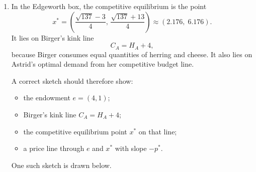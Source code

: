 \documentclass[12pt]{article}
\begin{document}
\begin{enumerate}[label=(\alph*)]
    \paragraph{Equilibrium allocations.}
    Substitute \(p^{*}\) into Astrid's demand:
    \[
    H_A^{*}=\frac{4p^{*}+1}{2p^{*}}
    =\frac{\sqrt{137}-3}{4},
    \]
    and
    \[
    C_A^{*}=\frac{4p^{*}+1}{2}
    =\frac{\sqrt{137}+13}{4}.
    \]
    Birger then consumes
    \[
    H_B^{*}=4-H_A^{*}=\frac{19-\sqrt{137}}{4},
    \]
    and
    \[
    C_B^{*}=8-C_A^{*}=\frac{19-\sqrt{137}}{4}.
    \]

    Hence the competitive equilibrium is

    \begin{equation*}
    \boxed{
    \begin{aligned}
        p^{*} &= \frac{11+\sqrt{137}}{8}, \\
        (H_A^{*},C_A^{*}) &= \left(\frac{\sqrt{137}-3}{4},\,\frac{\sqrt{137}+13}{4}\right), \\
        (H_B^{*},C_B^{*}) &= \left(\frac{19-\sqrt{137}}{4},\,\frac{19-\sqrt{137}}{4}\right).
    \end{aligned}
    }
\end{equation*}

    \item
    In the Edgeworth box, the competitive equilibrium is the point
    \[
    x^{*}=\left(\frac{\sqrt{137}-3}{4},\,\frac{\sqrt{137}+13}{4}\right)
    \approx (2.176,\;6.176).
    \]
    It lies on Birger's kink line
    \[
    C_A=H_A+4,
    \]
    because Birger consumes equal quantities of herring and cheese. It also lies on Astrid's optimal demand from her competitive budget line.

    A correct sketch should therefore show:
    \begin{itemize}[leftmargin=*]
        \item the endowment \(e=(4,1)\);
        \item Birger's kink line \(C_A=H_A+4\);
        \item the competitive equilibrium point \(x^{*}\) on that line;
        \item a price line through \(e\) and \(x^{*}\) with slope \(-p^{*}\).
    \end{itemize}

    One such sketch is drawn below.

\begin{center}
\end{center}
\end{enumerate}
\end{document}
